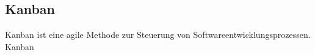 \subsection{Kanban}

Kanban ist eine agile Methode zur Steuerung von Softwareentwicklungsprozessen. Kanban

\cite{kanban_vorgehensmodell}